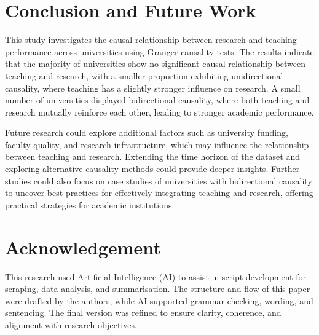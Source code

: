 \documentclass[conference]{IEEEtran}
\begin{document}
\section{Conclusion and Future Work}
\label{sec:conclusion_and_future_work}

This study investigates the causal relationship between research and teaching performance across universities using Granger causality tests. The results indicate that the majority of universities show no significant causal relationship between teaching and research, with a smaller proportion exhibiting unidirectional causality, where teaching has a slightly stronger influence on research. A small number of universities displayed bidirectional causality, where both teaching and research mutually reinforce each other, leading to stronger academic performance.

Future research could explore additional factors such as university funding, faculty quality, and research infrastructure, which may influence the relationship between teaching and research. Extending the time horizon of the dataset and exploring alternative causality methods could provide deeper insights. Further studies could also focus on case studies of universities with bidirectional causality to uncover best practices for effectively integrating teaching and research, offering practical strategies for academic institutions.


\section*{Acknowledgement}

This research used Artificial Intelligence (AI) to assist in script development for scraping, data analysis, and summarisation. The structure and flow of this paper were drafted by the authors, while AI supported grammar checking, wording, and sentencing. The final version was refined to ensure clarity, coherence, and alignment with research objectives.



\end{document}
